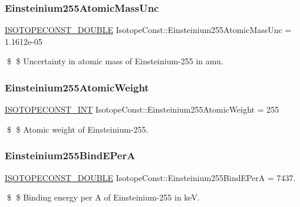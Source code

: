 \subsubsection{\texorpdfstring{Einsteinium255\+Atomic\+Mass\+Unc}{Einsteinium255AtomicMassUnc}}
{\footnotesize\ttfamily \mbox{\hyperlink{group___isotope_const-_macros_ga8f45a7272ce02c0b4c65c44636ed719a}{I\+S\+O\+T\+O\+P\+E\+C\+O\+N\+S\+T\+\_\+\+D\+O\+U\+B\+LE}} Isotope\+Const\+::\+Einsteinium255\+Atomic\+Mass\+Unc = 1.\+1612e-\/05}

\$ \$ Uncertainty in atomic mass of Einsteinium-\/255 in amu. \mbox{\label{group___isotope_const-_einsteinium-_es255_gae3d2dd3fcfcee4d1a1be22be552fbb28}} 
\subsubsection{\texorpdfstring{Einsteinium255\+Atomic\+Weight}{Einsteinium255AtomicWeight}}
{\footnotesize\ttfamily \mbox{\hyperlink{group___isotope_const-_macros_ga5f18360b3e99483a35c32d789e62621c}{I\+S\+O\+T\+O\+P\+E\+C\+O\+N\+S\+T\+\_\+\+I\+NT}} Isotope\+Const\+::\+Einsteinium255\+Atomic\+Weight = 255}

\$ \$ Atomic weight of Einsteinium-\/255. \mbox{\label{group___isotope_const-_einsteinium-_es255_ga3cd2d1323e412a917e70e15236438156}} 
\subsubsection{\texorpdfstring{Einsteinium255\+Bind\+E\+PerA}{Einsteinium255BindEPerA}}
{\footnotesize\ttfamily \mbox{\hyperlink{group___isotope_const-_macros_ga8f45a7272ce02c0b4c65c44636ed719a}{I\+S\+O\+T\+O\+P\+E\+C\+O\+N\+S\+T\+\_\+\+D\+O\+U\+B\+LE}} Isotope\+Const\+::\+Einsteinium255\+Bind\+E\+PerA = 7437.}

\$ \$ Binding energy per A of Einsteinium-\/255 in keV. \mbox{\label{group___isotope_const-_einsteinium-_es255_ga3b3e636d82caf2f518130e9a9b3aeeb0}} 
